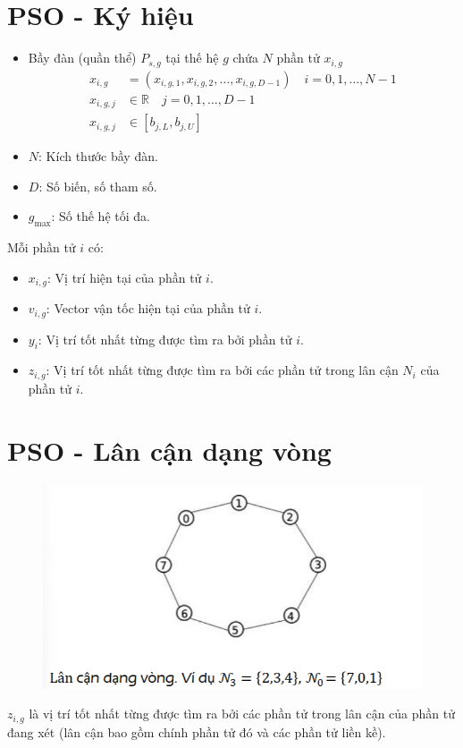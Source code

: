 \documentclass{book}
\begin{document}
\section{PSO - Ký hiệu}
\begin{itemize}
    \item Bầy đàn (quần thể) $P_{s,g}$ tại thế hệ $g$ chứa $N$ phần tử $x_{i,g}$
    \begin{align*}
        x_{i,g} &= (x_{i,g,1}, x_{i,g,2}, \dots, x_{i,g,D-1}) \quad i = 0,1,\dots,N-1 \\
        x_{i,g,j} &\in \mathbb{R} \quad j = 0,1,\dots,D-1 \\
        x_{i,g,j} &\in [b_{j,L}, b_{j,U}]
    \end{align*}
    \item $N$: Kích thước bầy đàn.
    \item $D$: Số biến, số tham số.
    \item $g_{\text{max}}$: Số thế hệ tối đa.
\end{itemize}

Mỗi phần tử $i$ có:
\begin{itemize}
    \item $x_{i,g}$: Vị trí hiện tại của phần tử $i$.
    \item $v_{i,g}$: Vector vận tốc hiện tại của phần tử $i$.
    \item $y_i$: Vị trí tốt nhất từng được tìm ra bởi phần tử $i$.
    \item $z_{i,g}$: Vị trí tốt nhất từng được tìm ra bởi các phần tử trong lân cận $N_i$ của phần tử $i$.
\end{itemize}

\section{PSO - Lân cận dạng vòng}
\begin{figure}[H]
    \centering
    \includegraphics[width=0.75\linewidth]{images/GA-3_21.png}
\end{figure}
$z_{i,g}$ là vị trí tốt nhất từng được tìm ra bởi các phần tử trong lân cận của phần tử đang xét (lân cận bao gồm chính phần tử đó và các phần tử liền kề).
\end{document}
